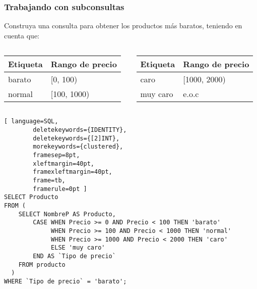 
\begin{frame}[fragile]
	
	\frametitle{Trabajando con subconsultas}
	
	Construya una consulta para obtener los productos más baratos, teniendo en cuenta que: 
 
    \vspace{-4mm}
	
	\begin{columns}[t]
		\begin{table}[]
			\begin{tabular}{|l|l|}
				\hline
				Etiqueta & Rango de precio \\ \hline \hline
				barato   & {[}0, 100)        \\ \hline
				normal   & {[}100, 1000)       \\ \hline
			\end{tabular}
		\end{table}
		
		
		\begin{table}[]
			\begin{tabular}{|l|l|}
				\hline
				Etiqueta   & Rango de precio \\ \hline \hline
				caro          & {[}1000, 2000)        \\ \hline
				muy caro & e.o.c       \\ \hline
			\end{tabular}
		\end{table}
		
	\end{columns}
	
	\pause
	
	\begin{lstlisting}[ language=SQL,
		deletekeywords={IDENTITY},
		deletekeywords={[2]INT},
		morekeywords={clustered},
		framesep=8pt,
		xleftmargin=40pt,
		framexleftmargin=40pt,
		frame=tb,
		framerule=0pt ]
SELECT Producto
FROM ( 
    SELECT NombreP AS Producto, 
        CASE WHEN Precio >= 0 AND Precio < 100 THEN 'barato'
             WHEN Precio >= 100 AND Precio < 1000 THEN 'normal'
             WHEN Precio >= 1000 AND Precio < 2000 THEN 'caro'
             ELSE 'muy caro'
        END AS `Tipo de precio`
    FROM producto
  ) 
WHERE `Tipo de precio` = 'barato';  
\end{lstlisting}
		
\end{frame}

